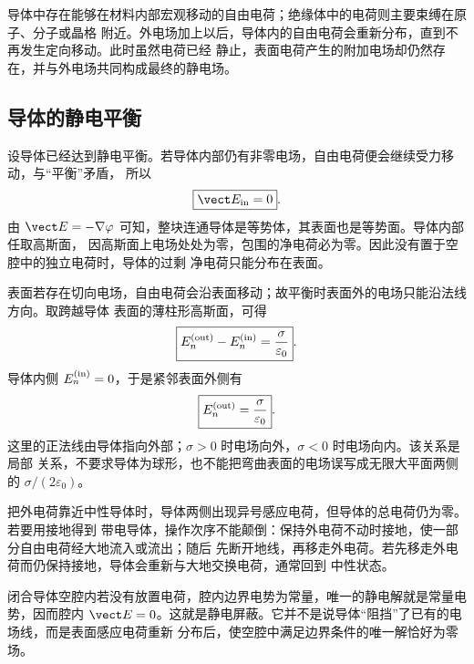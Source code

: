 导体中存在能够在材料内部宏观移动的自由电荷；绝缘体中的电荷则主要束缚在原子、分子或晶格
附近。外电场加上以后，导体内的自由电荷会重新分布，直到不再发生定向移动。此时虽然电荷已经
静止，表面电荷产生的附加电场却仍然存在，并与外电场共同构成最终的静电场。

\subsection*{导体的静电平衡}

设导体已经达到静电平衡。若导体内部仍有非零电场，自由电荷便会继续受力移动，与“平衡”矛盾，
所以
\begin{equation}
  \boxed{\vect E_{\rm in}=0}.
\end{equation}
由 $\vect E=-\nabla\varphi$ 可知，整块连通导体是等势体，其表面也是等势面。导体内部任取高斯面，
因高斯面上电场处处为零，包围的净电荷必为零。因此没有置于空腔中的独立电荷时，导体的过剩
净电荷只能分布在表面。

表面若存在切向电场，自由电荷会沿表面移动；故平衡时表面外的电场只能沿法线方向。取跨越导体
表面的薄柱形高斯面，可得
\begin{equation}
  \boxed{E_n^{\rm(out)}-E_n^{\rm(in)}=\frac{\sigma}{\varepsilon_0}}.
\end{equation}
导体内侧 $E_n^{\rm(in)}=0$，于是紧邻表面外侧有
\begin{equation}
  \boxed{E_n^{\rm(out)}=\frac{\sigma}{\varepsilon_0}}.
\end{equation}
这里的正法线由导体指向外部；$\sigma>0$ 时电场向外，$\sigma<0$ 时电场向内。该关系是局部
关系，不要求导体为球形，也不能把弯曲表面的电场误写成无限大平面两侧的
$\sigma/(2\varepsilon_0)$。

\twoConductorFieldDiagram

\conductorEquilibriumDiagram

把外电荷靠近中性导体时，导体两侧出现异号感应电荷，但导体的总电荷仍为零。若要用接地得到
带电导体，操作次序不能颠倒：保持外电荷不动时接地，使一部分自由电荷经大地流入或流出；随后
先断开地线，再移走外电荷。若先移走外电荷而仍保持接地，导体会重新与大地交换电荷，通常回到
中性状态。

\inductionGroundingDiagram

闭合导体空腔内若没有放置电荷，腔内边界电势为常量，唯一的静电解就是常量电势，因而腔内
$\vect E=0$。这就是静电屏蔽。它并不是说导体“阻挡”了已有的电场线，而是表面感应电荷重新
分布后，使空腔中满足边界条件的唯一解恰好为零场。


